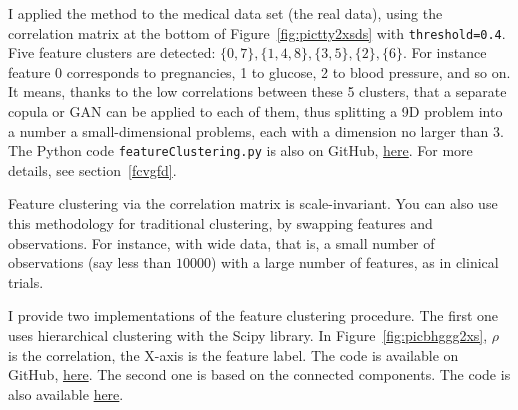 \documentclass[oneside,10pt]{book}
\begin{document}
I applied the method to the medical data set (the real data), using the correlation matrix at the bottom
 of Figure~\ref{fig:pictty2xsds} with \texttt{threshold=0.4}. Five feature clusters are
 detected: $\{0, 7\}, \{1, 4, 8\}, \{3, 5\}, \{2\}, \{6\}$. For instance feature 0 corresponds to pregnancies, 1 to glucose, 2 to blood pressure, and so on. It means, thanks to the low correlations between these 5 clusters, that a separate copula or GAN can be applied to each of them, thus splitting a 9D problem into a number a small-dimensional problems, each with a dimension no larger than 3. The Python code 
\texttt{featureClustering.py} is also
 on GitHub, \href{https://github.com/VincentGranville/Main/blob/main/featureClustering.py}{here}. For more details, see section~\ref{fcvgfd}.

Feature clustering via the correlation matrix is scale-invariant. You can also use this methodology for traditional clustering, by swapping features and observations. For instance, with 
\textcolor{index}{wide data}, that is, a small number of observations (say less than $\num{10000}$) with a large number of features, as in clinical trials. 

I provide two implementations of the feature clustering procedure. The first one uses 
\textcolor{index}{hierarchical clustering} with the Scipy library. In 
 Figure~\ref{fig:picbhggg2xs}, $\rho$ is the correlation, the X-axis is the feature label. The code is available on GitHub,
 \href{https://github.com/VincentGranville/Main/blob/main/featureClusteringScipy.py}{here}. The second one is based on the connected components. The code  
 is also available \href{https://github.com/VincentGranville/Main/blob/main/featureClustering.py}{here}. \vspace{1ex}
\end{document}
